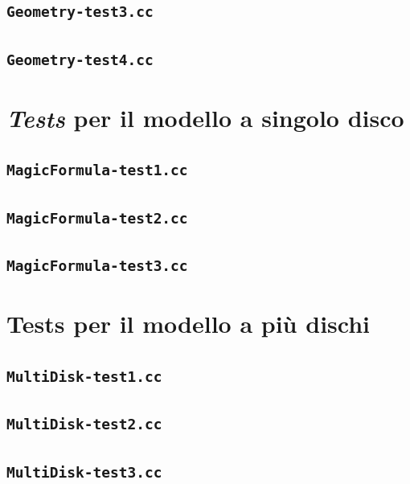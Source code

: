 \subsection{\texttt{Geometry-test3.cc}}
\renewcommand{\baselinestretch}{1.0}

\renewcommand{\baselinestretch}{1.25}
%
\subsection{\texttt{Geometry-test4.cc}}
\renewcommand{\baselinestretch}{1.0}

\renewcommand{\baselinestretch}{1.25}
%
\section{\textit{Tests} per il modello a singolo disco}
%
\subsection{\texttt{MagicFormula-test1.cc}}
\renewcommand{\baselinestretch}{1.0}

\renewcommand{\baselinestretch}{1.25}
%
\subsection{\texttt{MagicFormula-test2.cc}}
\renewcommand{\baselinestretch}{1.0}

\renewcommand{\baselinestretch}{1.25}
%
\subsection{\texttt{MagicFormula-test3.cc}}
\renewcommand{\baselinestretch}{1.0}

\renewcommand{\baselinestretch}{1.25}
%
\section{Tests per il modello a più dischi}
%
\subsection{\texttt{MultiDisk-test1.cc}}
\renewcommand{\baselinestretch}{1.0}

\renewcommand{\baselinestretch}{1.25}
%
\subsection{\texttt{MultiDisk-test2.cc}}
\renewcommand{\baselinestretch}{1.0}

\renewcommand{\baselinestretch}{1.25}
%
\subsection{\texttt{MultiDisk-test3.cc}}
\renewcommand{\baselinestretch}{1.0}

\renewcommand{\baselinestretch}{1.25}
